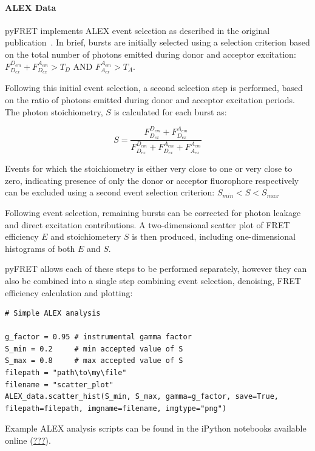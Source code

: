\paragraph{ALEX Data}
pyFRET implements ALEX event selection as described in the original publication~\cite{lee06}. In brief, bursts are initially selected using a selection criterion based on the total number of photons emitted during donor and acceptor excitation:
 $F_{D_{ex}}^{D_{em}} + F_{D_{ex}}^{A_{em}} > T_D$ AND $F_{A_{ex}}^{A_{em}} > T_A$.

Following this initial event selection, a second selection step is performed, based on the ratio of photons emitted during donor and acceptor excitation periods. The photon stoichiometry, $S$ is calculated for each burst as:

\begin{equation}
S = \frac{F_{D_{ex}}^{D_{em}} + F_{D_{ex}}^{A_{em}}}{F_{D_{ex}}^{D_{em}} + F_{D_{ex}}^{A_{em}} + F_{A_{ex}}^{A_{em}}}
\label{eq:Eprod_ALEX}
\end{equation}

Events for which the stoichiometry is either very close to one or very close to zero, indicating presence of only the donor or acceptor fluorophore respectively can be excluded using a second event selection criterion: $S_{min} < S < S_{max}$

Following event selection, remaining bursts can be corrected for photon leakage and direct excitation contributions. A two-dimensional scatter plot of FRET efficiency $E$ and stoichiometery $S$ is then produced, including one-dimensional histograms of both $E$ and $S$. 

pyFRET allows each of these steps to be performed separately, however they can also be combined into a single step combining event selection, denoising, FRET efficiency calculation and plotting:

\begin{lstlisting}
# Simple ALEX analysis

g_factor = 0.95 # instrumental gamma factor
S_min = 0.2     # min accepted value of S
S_max = 0.8     # max accepted value of S
filepath = "path\to\my\file"
filename = "scatter_plot"
ALEX_data.scatter_hist(S_min, S_max, gamma=g_factor, save=True, filepath=filepath, imgname=filename, imgtype="png")
\end{lstlisting}

Example ALEX analysis scripts can be found in the iPython notebooks available online (\url{???}).

